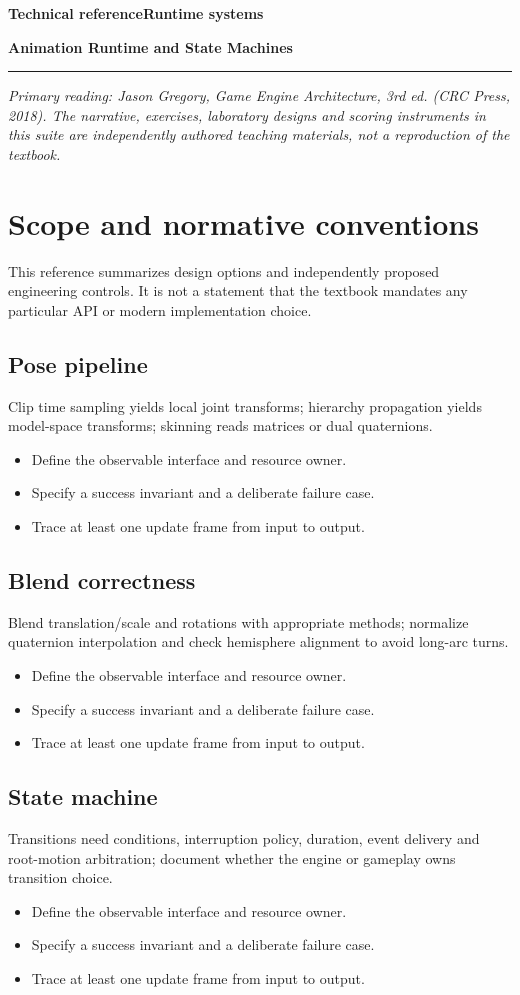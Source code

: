 \documentclass[11pt,letterpaper]{article}
\newcommand{\DocType}{Reference}
\newcommand{\SuiteHeading}[3]{%
\renewcommand{\DocType}{#2}%
{\small\bfseries\sffamily\color{EngineTeal}#2\hfill #3}\par\vspace{6pt}
{\LARGE\bfseries\color{EngineBlue}#1}\par\vspace{4pt}
{\color{EngineTeal}\rule{\linewidth}{1pt}}\par\vspace{7pt}}
\newcommand{\SourceNote}{\footnotesize\textit{Primary reading: Jason Gregory, \emph{Game Engine Architecture}, 3rd ed. (CRC Press, 2018). The narrative, exercises, laboratory designs and scoring instruments in this suite are independently authored teaching materials, not a reproduction of the textbook.}\normalsize\par}
\begin{document}
\SuiteHeading{Animation Runtime and State Machines}{Technical reference}{Runtime systems}
\SourceNote
\section{Scope and normative conventions}
This reference summarizes design options and independently proposed engineering controls. It is not a statement that the textbook mandates any particular API or modern implementation choice.

\subsection{Pose pipeline}
Clip time sampling yields local joint transforms; hierarchy propagation yields model-space transforms; skinning reads matrices or dual quaternions.

\begin{itemize}
\item Define the observable interface and resource owner.
\item Specify a success invariant and a deliberate failure case.
\item Trace at least one update frame from input to output.
\end{itemize}
\subsection{Blend correctness}
Blend translation/scale and rotations with appropriate methods; normalize quaternion interpolation and check hemisphere alignment to avoid long-arc turns.

\begin{itemize}
\item Define the observable interface and resource owner.
\item Specify a success invariant and a deliberate failure case.
\item Trace at least one update frame from input to output.
\end{itemize}
\subsection{State machine}
Transitions need conditions, interruption policy, duration, event delivery and root-motion arbitration; document whether the engine or gameplay owns transition choice.

\begin{itemize}
\item Define the observable interface and resource owner.
\item Specify a success invariant and a deliberate failure case.
\item Trace at least one update frame from input to output.
\end{itemize}
\end{document}
